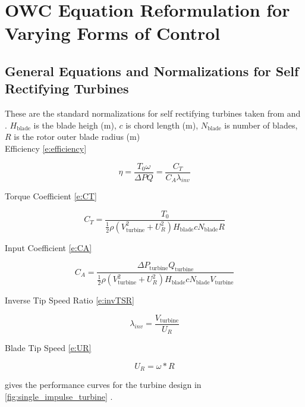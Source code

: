 \documentclass[conf]{new-aiaa}
\begin{document}
\section{OWC Equation Reformulation for Varying Forms of Control}

\subsection{General Equations and Normalizations for Self Rectifying Turbines}


These are the standard normalizations for self rectifying turbines taken from \cite{Setoguchi:2004aa} and \cite{Takao:2019aa}. $H_\text{blade}$ is the blade heigh (m), $c$ is chord length (m), $N_\text{blade}$ is number of blades, $R$ is the rotor outer blade radius (m)\\

Efficiency \cref{e:efficiency}

    \begin{equation}
\label{e:efficiency}
 \eta = \frac{T_0 \omega} {\Delta P Q} = \frac{C_T}{C_A \lambda_{inv}}
\end{equation}

Torque Coefficient \cref{e:CT}

    \begin{equation}
\label{e:CT}
 C_T = \frac{T_0} {\frac{1}{2}\rho(V_\text{turbine}^2 + U_R^2) H_\text{blade} c N_\text{blade} R}
\end{equation}

Input Coefficient \cref{e:CA}

    \begin{equation}
\label{e:CA}
 C_A = \frac{\Delta P_\text{turbine} Q_\text{turbine}}{\frac{1}{2}\rho(V_\text{turbine}^2 + U_R^2) H_\text{blade} c N_\text{blade} V_\text{turbine}}
\end{equation}

Inverse Tip Speed Ratio \cref{e:invTSR}

    \begin{equation}
\label{e:invTSR}
 \lambda_{inv} = \frac{V_\text{turbine}}{U_R}
\end{equation}

Blade Tip Speed \cref{e:UR}

    \begin{equation}
\label{e:UR}
U_R = \omega * R
\end{equation}

 gives the performance curves for the turbine design in \cref{fig:single_impulse_turbine} \cite{Setoguchi:2004aa}.
\end{document}
